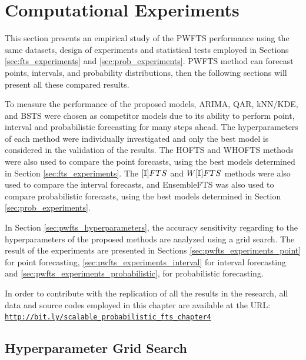 \section{Computational Experiments}
\label{sec:pwfts_experiments}

This section presents an empirical study of the PWFTS performance using the same datasets, design of experiments and statistical tests employed in Sections \ref{sec:fts_experiments} and \ref{sec:prob_experiments}. PWFTS method can forecast points, intervals, and probability distributions, then the following sections will present all these compared results.

To measure the performance of the proposed models, ARIMA, QAR, kNN/KDE, and BSTS were chosen as competitor models due to its ability to perform point, interval and probabilistic forecasting for many steps ahead. The hyperparameters of each method were individually investigated and only the best model is considered in the validation of the results. The HOFTS and WHOFTS methods were also used to compare the point forecasts, using the best models determined in Section \ref{sec:fts_experiments}. The $[\mathbb{I}]FTS$ and $W[\mathbb{I}]FTS$ methods were also used to compare the interval forecasts, and EnsembleFTS was also used to compare probabilistic forecasts, using the best models determined in Section \ref{sec:prob_experiments}.

In Section \ref{sec:pwfts_hyperparameters}, the accuracy sensitivity regarding to the hyperparameters of the proposed methods are analyzed using a grid search. The result of the experiments are presented in Sections \ref{sec:pwfts_experiments_point} for point forecasting, \ref{sec:pwfts_experiments_interval} for interval forecasting  and  \ref{sec:pwfts_experiments_probabilistic}, for probabilistic forecasting.

In order to contribute with the replication of all the results in the research, all data and source codes employed in this chapter are available at the URL:
\texttt{\url{http://bit.ly/scalable_probabilistic_fts_chapter4}}

\subsection{Hyperparameter Grid Search}
\label{sec:pwfts_hyperparameters}

